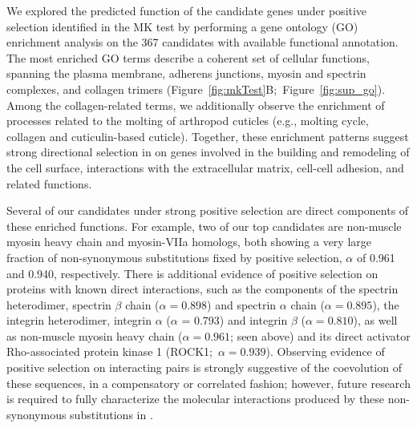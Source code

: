 We explored the predicted function of the candidate genes under positive selection
identified in the MK test by performing a gene ontology (GO) enrichment analysis on the
367 candidates with available functional annotation.
The most enriched GO terms describe a coherent set of cellular functions, spanning the
plasma membrane, adherens junctions, myosin and spectrin complexes, and collagen trimers
(Figure~\ref{fig:mkTest}B;~Figure~\ref{fig:sup_go}).
Among the collagen-related terms, we additionally observe the enrichment of processes
related to the molting of arthropod cuticles (e.g., molting cycle, collagen and
cuticulin-based cuticle).
Together, these enrichment patterns suggest strong directional selection in \bgla{}
on genes involved in the building and remodeling of the cell surface, interactions with
the extracellular matrix, cell-cell adhesion, and related functions.
\vspace{0.1cm}

Several of our candidates under strong positive selection are direct components of these
enriched functions.
For example, two of our top candidates are non-muscle myosin heavy chain and myosin-VIIa homologs,
both showing a very large fraction of non-synonymous substitutions fixed by positive selection,
$\alpha$ of 0.961 and 0.940, respectively.
There is additional evidence of positive selection on proteins with known direct interactions,
such as the components of the spectrin heterodimer, spectrin $\beta$ chain ($\alpha = 0.898$) and
spectrin $\alpha$ chain ($\alpha = 0.895$), the integrin heterodimer, integrin $\alpha$
($\alpha$ = 0.793) and integrin $\beta$ ($\alpha = 0.810$), as well as non-muscle myosin heavy
chain ($\alpha = 0.961$; seen above) and its direct activator Rho-associated protein kinase 1
(ROCK1;~$\alpha = 0.939$).
Observing evidence of positive selection on interacting pairs is strongly suggestive of the
coevolution of these sequences, in a compensatory or correlated fashion; however, future research
is required to fully characterize the molecular interactions produced by these non-synonymous
substitutions in \bgla{}.
\vspace{0.1cm}

